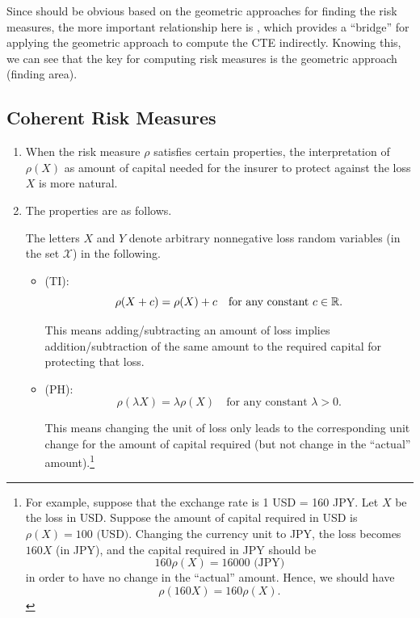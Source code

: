 \begin{enumerate}
Since  should be obvious based on the geometric
approaches for finding the risk measures, the more important relationship here
is , which provides a ``bridge'' for applying the
geometric approach to compute the CTE indirectly. Knowing this, we can see that
the key  for computing risk measures is the geometric approach
(finding area).
\end{enumerate}
\subsection{Coherent Risk Measures}
\label{subsect:coherent-risk-measures}
\begin{enumerate}
\item When the risk measure \(\rho\) satisfies certain properties, the
interpretation of \(\rho(X)\) as amount of capital needed for the insurer to
protect against the loss \(X\) is more natural.
\item The properties are as follows. \begin{note}
The letters \(X\) and \(Y\) denote arbitrary nonnegative loss random variables
(in the set \(\mathcal{X}\)) in the following.
\end{note}
\begin{itemize}
\item {} (TI):
\[
\rho(X+c)=\rho(X)+c\quad\text{for any constant \(c\in\mathbb{R}\)}.
\]
\begin{note}
This means adding/subtracting an amount of loss implies addition/subtraction of
the same amount to the required capital for protecting that loss.
\end{note}
\item {} (PH):
\[
\rho(\lambda X)=\lambda\rho(X)\quad\text{for any constant \(\lambda>0\)}.
\]
\begin{note}
This means changing the unit of loss only leads to the corresponding unit
change for the amount of capital required (but not change in the ``actual''
amount).\footnote{For example, suppose that the exchange rate is 1 USD = 160
JPY. Let \(X\) be the loss in USD. Suppose the amount of capital required in
USD is \(\rho(X)=100\text{ (USD)}\).  Changing the currency unit to JPY, the
loss becomes \(160X\) (in JPY), and the capital required in JPY should be
\[
160\rho(X)=16000\text{ (JPY)}
\]
in order to have no change in the ``actual'' amount. Hence, we should have
\[
\rho(160X)=160\rho(X).
\]}
\end{note}

\end{itemize}
\end{enumerate}
